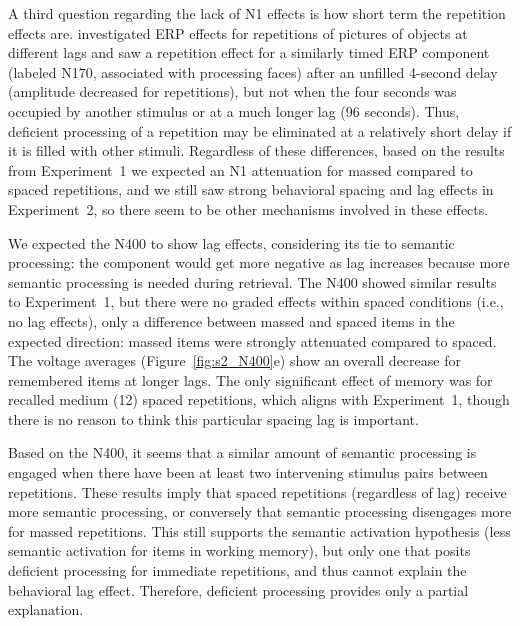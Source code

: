 
A third question regarding the lack of N1 effects is how short term the repetition effects are.   investigated ERP effects for repetitions of pictures of objects at different lags and saw a repetition effect for a similarly timed ERP component (labeled N170, associated with processing faces) after an unfilled 4-second delay (amplitude decreased for repetitions), but not when the four seconds was occupied by another stimulus or at a much longer lag (96 seconds).  Thus, deficient processing of a repetition may be eliminated at a relatively short delay if it is filled with other stimuli.  Regardless of these differences, based on the results from Experiment~1 we expected an N1 attenuation for massed compared to spaced repetitions, and we still saw strong behavioral spacing and lag effects in Experiment~2, so there seem to be other mechanisms involved in these effects.


We expected the N400 to show lag effects, considering its tie to semantic processing: the component would get more negative as lag increases because more semantic processing is needed during retrieval.  The N400 showed similar results to Experiment~1, but there were no graded effects within spaced conditions (i.e., no lag effects), only a difference between massed and spaced items in the expected direction: massed items were strongly attenuated compared to spaced.  The voltage averages (Figure~\ref{fig:s2_N400}e) show an overall decrease for remembered items at longer lags.  The only significant effect of memory was for recalled medium (12) spaced repetitions, which aligns with Experiment~1, though there is no reason to think this particular spacing lag is important.

Based on the N400, it seems that a similar amount of semantic processing is engaged when there have been at least two intervening stimulus pairs between repetitions.
These results imply that spaced repetitions (regardless of lag) receive more semantic processing, or conversely that semantic processing disengages more for massed repetitions.  This still supports the  semantic activation hypothesis (less semantic activation for items in working memory), but only one that posits deficient processing for immediate repetitions, and thus cannot explain the behavioral lag effect.
Therefore, deficient processing provides only a partial explanation.


